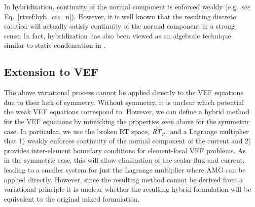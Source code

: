 \documentclass[../doc.tex]{subfiles}
\begin{document}
In hybridization, continuity of the normal component is enforced weakly (e.g.~see Eq.~\ref{rtvef:hyb_cts_n}). However, it is well known that the resulting discrete solution will actually satisfy continuity of the normal component in a strong sense. In fact, hybridization has also been viewed as an algebraic technique similar to static condensation in \cite{doi:10.1137/17M1132562}. 

\subsection{Extension to VEF}
The above variational process cannot be applied directly to the VEF equations due to their lack of symmetry. Without symmetry, it is unclear which potential the weak VEF equations correspond to. However, we can define a hybrid method for the VEF equations by mimicking the properties seen above for the symmetric case. In particular, we use the broken RT space, $\hat{\mathit{RT}}_p$, and a Lagrange multiplier that 1) weakly enforces continuity of the normal component of the current and 2) provides inter-element boundary conditions for element-local VEF problems. As in the symmetric case, this will allow elimination of the scalar flux and current, leading to a smaller system for just the Lagrange multiplier where AMG can be applied directly. However, since the resulting method cannot be derived from a variational principle it is unclear whether the resulting hybrid formulation will be equivalent to the original mixed formulation. 
\end{document}
